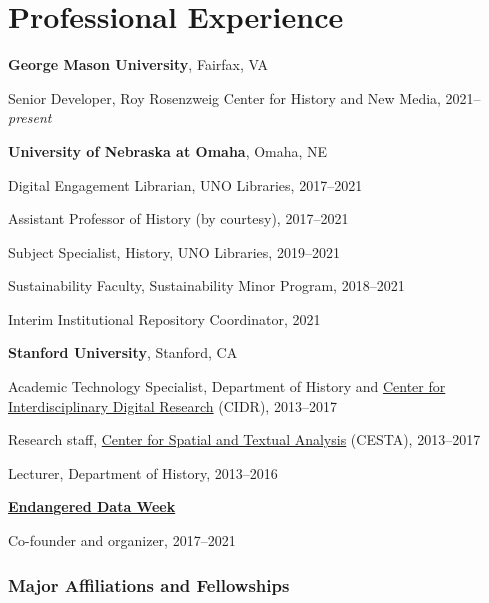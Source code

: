 \hypertarget{professional-experience}{%
\section{Professional Experience}\label{professional-experience}}

\textbf{George Mason University}, Fairfax, VA

\quad Senior Developer, Roy Rosenzweig Center for History and New Media,
2021--\emph{present}

\vspace{.4cm}

\textbf{University of Nebraska at Omaha}, Omaha, NE

\quad Digital Engagement Librarian, UNO Libraries, 2017--2021

\quad Assistant Professor of History (by courtesy), 2017--2021

\quad Subject Specialist, History, UNO Libraries, 2019--2021

\quad Sustainability Faculty, Sustainability Minor Program, 2018--2021

\quad Interim Institutional Repository Coordinator, 2021

\vspace{.4cm}

\textbf{Stanford University}, Stanford, CA

\quad Academic Technology Specialist, Department of History and
\href{http://cidr.stanford.edu}{Center for Interdisciplinary Digital
Research} (CIDR), 2013--2017

\quad Research staff, \href{http://cesta.stanford.edu}{Center for
Spatial and Textual Analysis} (CESTA), 2013--2017

\quad Lecturer, Department of History, 2013--2016

\vspace{.4cm}

\textbf{\href{https://endangereddataweek.org}{Endangered Data Week}}

\quad Co-founder and organizer, 2017--2021

\vspace{0.2cm}

\newpage

\hypertarget{major-affiliations-and-fellowships}{%
\subsubsection{Major Affiliations and
Fellowships}\label{major-affiliations-and-fellowships}}

